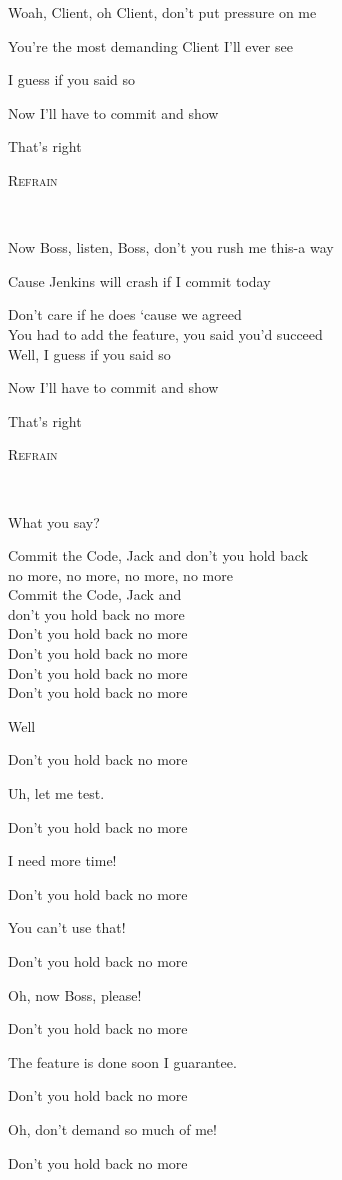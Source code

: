 \documentclass[11pt,a5paper]{article}
\newcommand\refrain[1]{\begin{tcolorbox}#1\end{tcolorbox} \ }
\newcommand{\refrefrain}{\refrain{\textsc{Refrain}} \ }
\begin{document}
\hfill Woah, Client, oh Client, don’t put pressure on me

\hfill You’re the most demanding Client I’ll ever see

\hfill I guess if you said so

\hfill Now I’ll have to commit and show 

That’s right \\

\refrefrain

\hfill Now Boss, listen, Boss, don’t you rush me this-a way

\hfill Cause Jenkins will crash if I commit today

Don’t care if he does ‘cause we agreed \\
You had to add the feature, you said you’d succeed \\

\hfill Well, I guess if you said so

\hfill Now I’ll have to commit and show 

That’s right \\

\refrefrain

\hfill What you say?

\refrain{
	Commit the Code, Jack and don’t you hold back \\
	no more, no more, no more, no more \\
	Commit the Code, Jack and \\ don’t you hold back no more \\
	Don’t you hold back no more \\
	Don’t you hold back no more \\
	Don’t you hold back no more \\
	Don’t you hold back no more
	
	\hfill Well
	
	Don’t you hold back no more
	
	\hfill Uh, let me test.
	
	Don’t you hold back no more
	
	\hfill I need more time!
	
	Don’t you hold back no more
	
	\hfill You can’t use that!
	
	Don’t you hold back no more
	
	\hfill Oh, now Boss, please!
	
	Don’t you hold back no more
	
	\hfill The feature is done soon I guarantee.
	
	Don’t you hold back no more
	
	\hfill Oh, don’t demand so much of me!
	
	Don’t you hold back no more}
\end{document}
